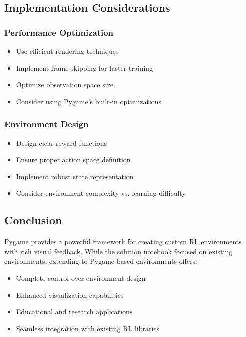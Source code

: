 \documentclass[12pt]{article}
\begin{document}
{{{\subsection{Implementation Considerations}

\subsubsection{Performance Optimization}

\begin{itemize}
    \item Use efficient rendering techniques
    \item Implement frame skipping for faster training
    \item Optimize observation space size
    \item Consider using Pygame's built-in optimizations
\end{itemize}

\subsubsection{Environment Design}

\begin{itemize}
    \item Design clear reward functions
    \item Ensure proper action space definition
    \item Implement robust state representation
    \item Consider environment complexity vs. learning difficulty
\end{itemize}

\subsection{Conclusion}

Pygame provides a powerful framework for creating custom RL environments with rich visual feedback. While the solution notebook focused on existing environments, extending to Pygame-based environments offers:

\begin{itemize}
    \item Complete control over environment design
    \item Enhanced visualization capabilities
    \item Educational and research applications
    \item Seamless integration with existing RL libraries
\end{itemize}

}}}
\end{document}

